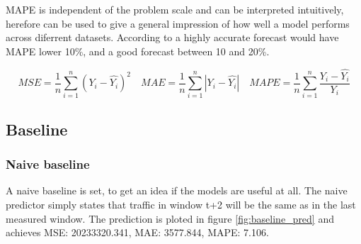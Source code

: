 \documentclass[12pt]{article}
\begin{document}
  MAPE is independent of the problem scale and 
  can be interpreted intuitively,  herefore can be used to give a general impression of how well a model
  performs across diferrent datasets. According to \cite{mape_values} a highly accurate forecast would 
  have MAPE lower 10\%, and a good forecast between 10 and 20\%.

  \begin{equation}
    \label{eq:metrics}
    MSE=\frac{1}{n} \sum_{i=1}^{n}(Y_i - \hat{Y_i})^2 \quad
    MAE=\frac{1}{n} \sum_{i=1}^{n}|Y_i - \hat{Y_i}| \quad
    MAPE=\frac{1}{n} \sum_{i=1}^{n}\frac{Y_i - \hat{Y_i}}{Y_i}
  \end{equation}
  


  \subsection{Baseline}
  \subsubsection{Naive baseline}
  A naive baseline is set, to get an idea if the models are useful at all. The 
  naive predictor simply states that traffic in window t+2 will be the same as 
  in the last measured window. The prediction is ploted in figure \ref{fig:baseline_pred}
  and achieves MSE: 20233320.341, MAE: 3577.844, MAPE: 7.106.
\end{document}
